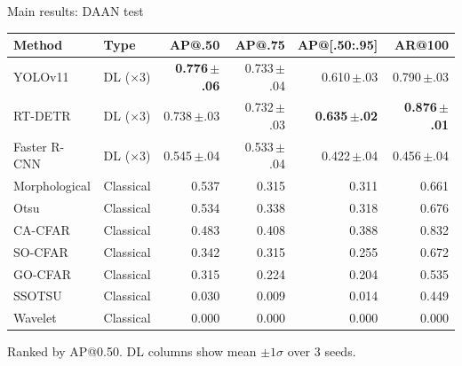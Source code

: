 \documentclass[aspectratio=169,10pt]{beamer}
\newcommand{\sub}[1]{{\footnotesize\textcolor{black70}{#1}}}
\begin{document}
\begin{frame}{Main results: DAAN test}
  \centering
  \renewcommand{\arraystretch}{1.12}
  \footnotesize
  \begin{tabular}{@{}l l r r r r@{}}
    \toprule
    \textbf{Method} & \textbf{Type} & \textbf{AP@.50} & \textbf{AP@.75} & \textbf{AP@[.50:.95]} & \textbf{AR@100} \\
    \midrule
    YOLOv11          & DL ($\times3$)   & \textbf{0.776\,\sub{$\pm$.06}} & 0.733\,\sub{$\pm$.04} & 0.610\,\sub{$\pm$.03} & 0.790\,\sub{$\pm$.03} \\
    RT-DETR          & DL ($\times3$)   & 0.738\,\sub{$\pm$.03} & 0.732\,\sub{$\pm$.03} & \textbf{0.635\,\sub{$\pm$.02}} & \textbf{0.876\,\sub{$\pm$.01}} \\
    Faster R-CNN     & DL ($\times3$)   & 0.545\,\sub{$\pm$.04} & 0.533\,\sub{$\pm$.04} & 0.422\,\sub{$\pm$.04} & 0.456\,\sub{$\pm$.04} \\
    \midrule
    Morphological    & Classical        & 0.537 & 0.315 & 0.311 & 0.661 \\
    Otsu             & Classical        & 0.534 & 0.338 & 0.318 & 0.676 \\
    CA-CFAR          & Classical        & 0.483 & 0.408 & 0.388 & 0.832 \\
    SO-CFAR          & Classical        & 0.342 & 0.315 & 0.255 & 0.672 \\
    GO-CFAR          & Classical        & 0.315 & 0.224 & 0.204 & 0.535 \\
    SSOTSU           & Classical        & 0.030 & 0.009 & 0.014 & 0.449 \\
    Wavelet          & Classical        & 0.000 & 0.000 & 0.000 & 0.000 \\
    \bottomrule
  \end{tabular}
  \vspace{0.5em}
  \par\sub{Ranked by AP@0.50. DL columns show mean $\pm 1\sigma$ over 3 seeds.}
\end{frame}
\end{document}
